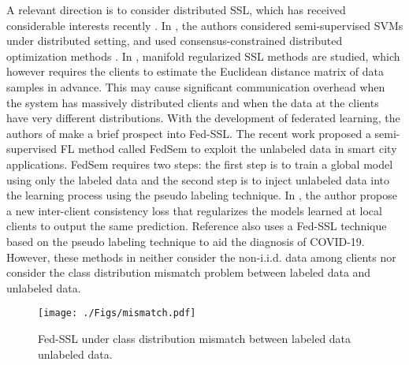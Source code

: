 \documentclass[twoside,journal]{IEEEtran}
\begin{document}
A relevant direction is to consider distributed SSL, which has received considerable interests recently \cite{chang2017distributed,avrachenkov2016distributed,scardapane2016distributed,liu2018distributed,fierimonte2016fully,xie2019distributed} . In
\cite{scardapane2016distributed,liu2018distributed}, the authors considered semi-supervised SVMs under distributed setting, and used consensus-constrained distributed optimization methods \cite{chang2014multi,zeng2018nonconvex}. In \cite{fierimonte2016fully,xie2019distributed}, manifold regularized SSL methods are studied,
which however requires the clients to estimate the Euclidean distance matrix of data samples in advance.
This may cause significant communication overhead when the system has massively distributed clients and when the data at the clients have very different distributions.
With the development of federated learning, the authors of \cite{jin2020survey}
make a brief prospect into Fed-SSL.
The recent work \cite{albaseer2020exploiting} proposed a semi-supervised FL method called FedSem to exploit the unlabeled data in smart city applications. FedSem requires two steps: the first step is to train a
global model using only the labeled data and the second step is to inject unlabeled data into the learning process using the pseudo labeling technique. In \cite{Jeong2021federated}, the author propose  a new inter-client consistency loss that regularizes the models learned at local clients to output the same prediction. Reference \cite{yang2021federated} also uses a Fed-SSL technique based on the pseudo labeling technique to aid the diagnosis of COVID-19. However, these methods in \cite{albaseer2020exploiting,Jeong2021federated,yang2021federated} neither consider the non-i.i.d. data among clients nor consider the class distribution mismatch problem between labeled data and unlabeled data.
\begin{figure}[t]
\begin{center}
\texttt{[image: ./Figs/mismatch.pdf]}
\vspace{-0.3cm}
\caption{Fed-SSL under class distribution mismatch between labeled data unlabeled data. }
\label{fig:mismatch}
\end{center}
\vspace{-0.6cm}
\end{figure}
\end{document}
